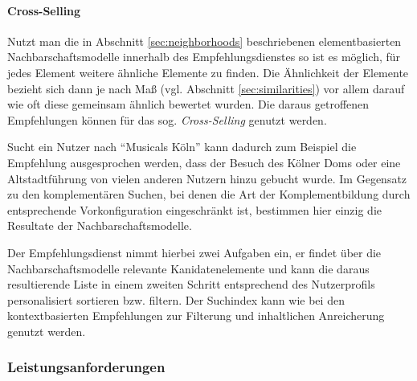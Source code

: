 
\paragraph{Cross-Selling} Nutzt man die in Abschnitt \ref{sec:neighborhoods} beschriebenen elementbasierten Nachbarschaftsmodelle innerhalb des Empfehlungsdienstes so ist es möglich, für jedes Element weitere ähnliche Elemente zu finden. Die Ähnlichkeit der Elemente bezieht sich dann je nach Maß (vgl. Abschnitt \ref{sec:similarities}) vor allem darauf wie oft diese gemeinsam ähnlich bewertet wurden. Die daraus getroffenen Empfehlungen können für das sog. \textit{Cross-Selling} genutzt werden.

Sucht ein Nutzer nach ``Musicals Köln'' kann dadurch zum Beispiel die Empfehlung ausgesprochen werden, dass der Besuch des Kölner Doms oder eine Altstadtführung von vielen anderen Nutzern hinzu gebucht wurde. Im Gegensatz zu den komplementären Suchen, bei denen die Art der Komplementbildung durch entsprechende Vorkonfiguration eingeschränkt ist, bestimmen hier einzig die Resultate der Nachbarschaftsmodelle.

Der Empfehlungsdienst nimmt hierbei zwei Aufgaben ein, er findet über die Nachbarschaftsmodelle relevante Kanidatenelemente und kann die daraus resultierende Liste in einem zweiten Schritt entsprechend des Nutzerprofils personalisiert sortieren bzw. filtern. Der Suchindex kann wie bei den kontextbasierten Empfehlungen zur Filterung und inhaltlichen Anreicherung genutzt werden.


\subsubsection{Leistungsanforderungen}\label{sec:performancereq}

